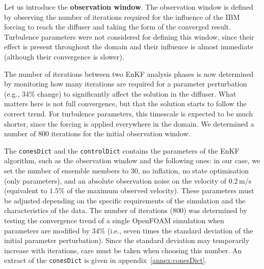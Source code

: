 Let us introduce the \textbf{observation window}.  
The observation window is defined by observing the number of iterations required for the influence of the IBM forcing to reach the diffuser and taking the form of the converged result. Turbulence parameters were not considered for defining this window, since their effect is present throughout the domain and their influence is almost immediate (although their convergence is slower).  

The number of iterations between two EnKF analysis phases is now determined by monitoring how many iterations are required for a parameter perturbation (e.g., $34\%$ change) to significantly affect the solution in the diffuser. What matters here is not full convergence, but that the solution starts to follow the correct trend. For turbulence parameters, this timescale is expected to be much shorter, since the forcing is applied everywhere in the domain.  
We determined a number of 800 iterations for the initial observation window.

The \texttt{conesDict} and the \texttt{controlDict} contains the parameters of the EnKF algorithm, such as the observation window and the following ones: in our case, we set the number of ensemble members to 30, no inflation, no state optimisation (only parameters), and an absolute observation noise on the velocity of $0.2 \, \text{m/s}$ (equivalent to $1.5\%$ of the maximum observed velocity). These parameters must be adjusted depending on the specific requirements of the simulation and the characteristics of the data. The number of iterations (800) was determined by testing the convergence trend of a single OpenFOAM simulation when parameters are modified by 34\% (i.e., seven times the standard deviation of the initial parameter perturbation). Since the standard deviation may temporarily increase with iterations, care must be taken when choosing this number.
An extract of the \texttt{conesDict} is given in appendix~\ref{annex:conesDict}.  


